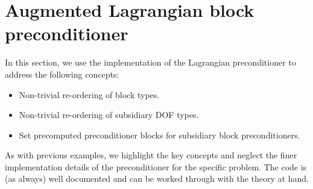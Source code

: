 \section{Augmented Lagrangian block preconditioner\label{sec:lagrangian_block_preconditioner}}
In this section, we use the implementation of the Lagrangian preconditioner to
address the following concepts:
\begin{itemize}
\item Non-trivial re-ordering of block types.
\item Non-trivial re-ordering of subsidiary DOF types.
\item Set precomputed preconditioner blocks for subsidiary block
  preconditioners.
\end{itemize}
As with previous examples, we highlight the key concepts and neglect the finer
implementation details of the preconditioner for the specific problem. The code
is (as always) well documented and can be worked through with the theory at
hand.
